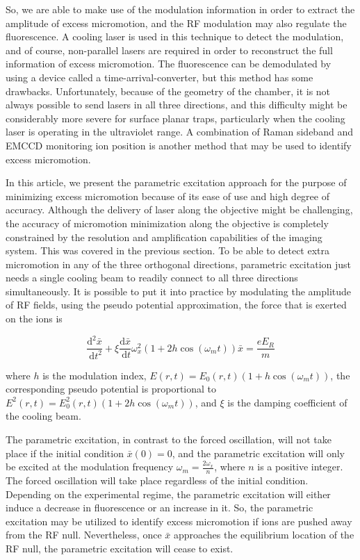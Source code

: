 So, we are able to make use of the modulation information in order to extract the amplitude of excess micromotion, and the RF modulation may also regulate the fluorescence. A cooling laser is used in this technique to detect the modulation, and of course, non-parallel lasers are required in order to reconstruct the full information of excess micromotion. The fluorescence can be demodulated by using a device called a time-arrival-converter, but this method has some drawbacks. Unfortunately, because of the geometry of the chamber, it is not always possible to send lasers in all three directions, and this difficulty might be considerably more severe for surface planar traps, particularly when the cooling laser is operating in the ultraviolet range. A combination of Raman sideband and EMCCD monitoring ion position is another method that may be used to identify excess micromotion.

In this article, we present the parametric excitation approach for the purpose of minimizing excess micromotion because of its ease of use and high degree of accuracy. Although the delivery of laser along the objective might be challenging, the accuracy of micromotion minimization along the objective is completely constrained by the resolution and amplification capabilities of the imaging system. This was covered in the previous section. To be able to detect extra micromotion in any of the three orthogonal directions, parametric excitation just needs a single cooling beam to readily connect to all three directions simultaneously. It is possible to put it into practice by modulating the amplitude of RF fields, using the pseudo potential approximation, the force that is exerted on the ions is

\begin{equation}\label{eq:parametric_excitation}
    \frac{\mathrm{d}^2 \bar{x}}{\mathrm{~d} t^2}+\xi \frac{\mathrm{d} \bar{x}}{\mathrm{~d} t} \omega_x^2\left(1+2 h \cos \left(\omega_m t\right)\right) \bar{x}=\frac{e E_R}{m}
\end{equation}

where \(h\) is the modulation index, \(E(r,t)=E_0(r,t)(1+h\cos(\omega_m t))\), the corresponding pseudo potential is proportional to \(E^2(r,t)=E_0^2(r,t)(1+2h\cos(\omega_m t))\), and \(\xi\) is the damping coefficient of the cooling beam.

The parametric excitation, in contrast to the forced oscillation, will not take place if the initial condition \(\bar{x}(0)=0\), and the parametric excitation will only be excited at the modulation frequency \(\omega_m=\frac{2\omega_x}{n}\), where \(n\) is a positive integer. The forced oscillation will take place regardless of the initial condition. Depending on the experimental regime, the parametric excitation will either induce a decrease in fluorescence or an increase in it. So, the parametric excitation may be utilized to identify excess micromotion if ions are pushed away from the RF null. Nevertheless, once \(\bar{x}\) approaches the equilibrium location of the RF null, the parametric excitation will cease to exist.

